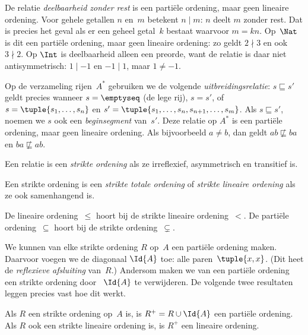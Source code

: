 \documentclass[../../../include/open-logic-section]{subfiles}
\begin{document}
\begin{ex}
De relatie \emph{deelbaarheid zonder rest} is een partiële ordening, maar geen
lineaire ordening. Voor gehele getallen $n$ en~$m$ betekent $n \mid m$: $n$
deelt $m$ zonder rest. Dat is precies het geval als er een geheel getal~$k$
bestaat waarvoor $m = kn$. Op~$\Nat$ is dit een partiële ordening, maar geen
lineaire ordening: zo geldt $2 \nmid 3$ en ook $3 \nmid 2$. Op $\Int$ is
deelbaarheid alleen een preorde, want de relatie is daar niet antisymmetrisch:
$1 \mid -1$ en $-1 \mid 1$, maar $1 \neq -1$.
\end{ex}

\begin{ex}
Op de verzameling rijen~$A^*$ gebruiken we de volgende
\emph{uitbreidingsrelatie}: $s \sqsubseteq s'$ geldt precies wanneer
$s = \emptyseq$ (de lege rij), $s = s'$, of $s =
\tuple{s_1, \dots, s_n}$ en $s' =
\tuple{s_1, \dots, s_n, s_{n+1}, \dots, s_m}$. Als $s \sqsubseteq s'$,
noemen we $s$ ook een \emph{beginsegment} van~$s'$. Deze relatie op $A^*$ is
een partiële ordening, maar geen lineaire ordening. Als bijvoorbeeld $a \neq b$,
dan geldt $ab \not\sqsubseteq ba$ en $ba \not\sqsubseteq ab$.
\end{ex}

\begin{defn}
Een relatie is een \emph{strikte ordening} als ze irreflexief, asymmetrisch en
transitief is.
\end{defn}

\begin{defn}
Een strikte ordening is een \emph{strikte totale ordening} of \emph{strikte
lineaire ordening} als ze ook samenhangend is.
\end{defn}

\begin{ex}
De lineaire ordening~$\le$ hoort bij de strikte lineaire ordening~$<$. De
partiële ordening~$\subseteq$ hoort bij de strikte ordening~$\subsetneq$.
\end{ex}

We kunnen van elke strikte ordening $R$ op~$A$ een partiële ordening maken.
Daarvoor voegen we de diagonaal $\Id{A}$ toe: alle paren~$\tuple{x,
x}$.  (Dit heet de \emph{reflexieve afsluiting} van~$R$.)
Andersom maken we van een partiële ordening een strikte ordening door
~$\Id{A}$ te verwijderen. De volgende twee resultaten leggen precies vast hoe
dit werkt.

\begin{prop}
Als $R$ een strikte ordening op~$A$ is, is $R^+ = R \cup \Id{A}$ een partiële
ordening. Als $R$ ook een strikte lineaire ordening is, is $R^+$ een lineaire
ordening.
\end{prop}
\end{document}
